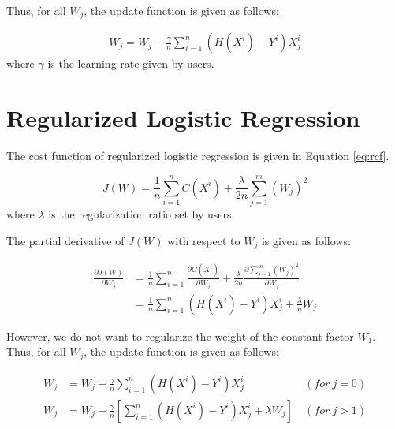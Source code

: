 \documentclass{sig-alternate}
\begin{document}
Thus, for all $W_{j}$, the update function is given as follows:

\begin{align*}
	W_{j}=W_{j}-\frac{\gamma}{n}\sum_{i=1}^{n}(H(X^{i})-Y^{i})X^{i}_{j}
\end{align*}
where $\gamma$ is the learning rate given by users.

\section{Regularized Logistic Regression}
The cost function of regularized logistic regression is given in Equation \eqref{eq:rcf}.

\begin{equation}
\label{eq:rcf}
	J(W)=\frac{1}{n}\sum_{i=1}^{n}C(X^{i})+\frac{\lambda}{2n}\sum_{j=1}^{m}(W_{j})^{2}
\end{equation}
where $\lambda$ is the regularization ratio set by users.

The partial derivative of $J(W)$ with respect to $W_{j}$ is given as follows:

\begin{align*}
	\frac{\partial{J(W)}}{\partial{W_{j}}}
	&=\frac{1}{n}\sum_{i=1}^{n}\frac{\partial{C(X^{i})}}{\partial{W_{j}}}+\frac{\lambda}{2n}\frac{\partial{\sum_{j=1}^{m}(W_{j})^{2}}}{\partial{W_{j}}}\\
	&=\frac{1}{n}\sum_{i=1}^{n}(H(X^{i})-Y^{i})X^{i}_{j}+\frac{\lambda}{n}W_{j}
\end{align*}

However, we do not want to regularize the weight of the constant factor $W_{1}$. Thus, for all $W_{j}$, the update function is given as follows:

\begin{align*}
	W_{j}&=W_{j}-\frac{\gamma}{n}\sum_{i=1}^{n}(H(X^{i})-Y^{i})X^{i}_{j}~&(for~j=0)\\
	W_{j}&=W_{j}-\frac{\gamma}{n}[\sum_{i=1}^{n}(H(X^{i})-Y^{i})X^{i}_{j}+\lambda W_{j}]~&(for~j>1)
\end{align*}
\end{document}
